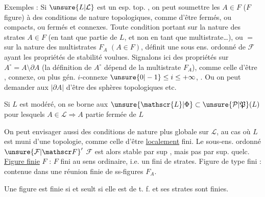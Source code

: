 Exemples : Si $\unsure{L|\mathcal L}$ est un esp. top. , 
on peut soumettre les $A\in F$  ($F$ figure)
à des conditions de nature topologiques, comme d'être fermés, ou  compacts, ou fermés et connexes. Toute condition
portant sur la nature des strates $A\in F$ (en tant que partie de $L$, et non en tant que multistrate\ldots), ou $=$ sur la nature des
multistrates $F_A$ $(A\in F)$, définit une sous ens. ordonné de $\mathcal F$ ayant les propriétés de stabilité voulues. Signalons ici
des propriétés  sur  $A^\circ=A\setminus\partial A$ (la définition de $A^\circ$ dépend de la multistrate $F_A$), comme celle d'être  ,
  connexe, ou plus gén. $i$-connexe $\unsure{0|-1}\leq i\leq+\infty$,  . Ou on peut demander aux $|\partial A|$
d'être des sphères topologiques etc.

Si $L$ est  modéré, on se borne aux $\unsure{\mathscr{L}|\Phi}\subset\unsure{\mathcal P|\mathfrak P}(L)$ pour lesquels $A\in\mathscr{L}\Longrightarrow A$ partie fermée \uline{} de $L$

On peut envisager aussi des conditions de nature plus globale sur $\mathscr{L}$, au cas où
$L$ est muni d'une topologie, comme celle d'être \uline{localement} fini. Le sous-ens.
ordonné ${\unsure{\mathcal F|\mathscr F}}'$  $\mathcal F$ est alors stable par sup , mais pas   par sup.
quelc. \uline{Figure finie} $F$ :  $F$ fini au sens ordinaire, i.e. un  fini de strates. Figure de type fini : contenue
dans une réunion finie de ss-figures $F_A$.

 Une figure est  finie  si et seult si elle est de t. f. et ses strates sont finies.

